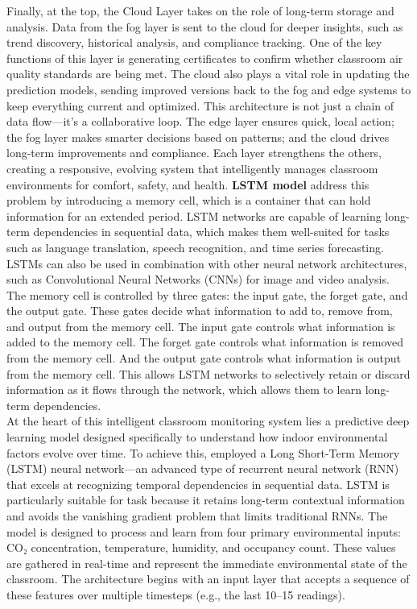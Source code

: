 Finally, at the top, the Cloud Layer takes on the role of long-term storage and analysis. Data from the fog layer is sent to the cloud for deeper insights, such as trend discovery, historical analysis, and compliance tracking. One of the key functions of this layer is generating certificates to confirm whether classroom air quality standards are being met. The cloud also plays a vital role in updating the prediction models, sending improved versions back to the fog and edge systems to keep everything current and optimized. This architecture is not just a chain of data flow—it's a collaborative loop. The edge layer ensures quick, local action; the fog layer makes smarter decisions based on patterns; and the cloud drives long-term improvements and compliance. Each layer strengthens the others, creating a responsive, evolving system that intelligently manages classroom environments for comfort, safety, and health.
\textbf{LSTM model} address this problem by introducing a memory cell, which is a container that can hold information for an extended period. LSTM networks are capable of learning long-term dependencies in sequential data, which makes them well-suited for tasks such as language translation, speech recognition, and time series forecasting. LSTMs can also be used in combination with other neural network architectures, such as Convolutional Neural Networks (CNNs) for image and video analysis. The memory cell is controlled by three gates: the input gate, the forget gate, and the output gate. These gates decide what information to add to, remove from, and output from the memory cell. The input gate controls what information is added to the memory cell. The forget gate controls what information is removed from the memory cell. And the output gate controls what information is output from the memory cell. This allows LSTM networks to selectively retain or discard information as it flows through the network, which allows them to learn long-term dependencies.\\


At the heart of this intelligent classroom monitoring system lies a predictive deep learning model designed specifically to understand how indoor environmental factors evolve over time. To achieve this, employed a Long Short-Term Memory (LSTM) neural network—an advanced type of recurrent neural network (RNN) that excels at recognizing temporal dependencies in sequential data. LSTM is particularly suitable for task because it retains long-term contextual information and avoids the vanishing gradient problem that limits traditional RNNs. The model is designed to process and learn from four primary environmental inputs: CO₂ concentration, temperature, humidity, and occupancy count. These values are gathered in real-time and represent the immediate environmental state of the classroom. The architecture begins with an input layer that accepts a sequence of these features over multiple timesteps (e.g., the last 10–15 readings).

